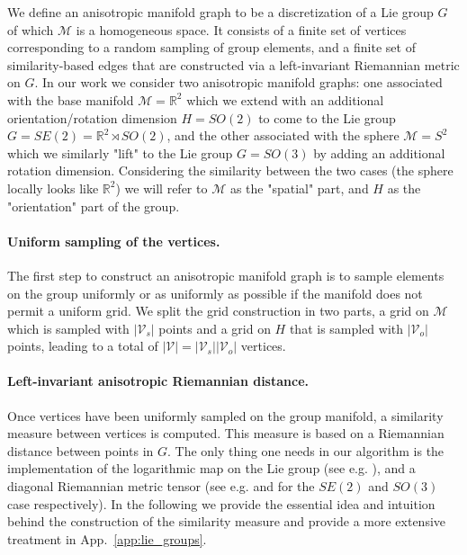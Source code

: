 \documentclass{article}
\begin{document}
We define an anisotropic manifold graph to be a discretization of a Lie group $G$ of which $\mathcal{M}$ is a homogeneous space. It consists of a finite set of vertices corresponding to a random sampling of group elements, and a finite set of similarity-based edges that are constructed via a left-invariant Riemannian metric on $G$. In our work we consider two anisotropic manifold graphs: one associated with the base manifold $\mathcal{M} = \mathbb{R}^2$ which we extend with an additional orientation/rotation dimension $H = SO(2)$ to come to the Lie group $G = SE(2) = \mathbb{R}^2 \rtimes SO(2)$, and the other associated with the sphere $\mathcal{M} = S^2$ which we similarly "lift" to the Lie group $G = SO(3)$ by adding an additional rotation dimension. %
Considering the similarity between the two cases (the sphere locally looks like $\mathbb{R}^2$) we will refer to $\mathcal{M}$ as the "spatial" part, and $H$ as the "orientation" part of the group. 

\paragraph{Uniform sampling of the vertices.} The first step to construct an anisotropic manifold graph is to sample elements on the group uniformly or as uniformly as possible if the manifold does not permit a uniform grid. We split the grid construction in two parts, a grid on $\mathcal{M}$ which is sampled with $|\mathcal{V}_s|$ points and a grid on $H$ that is sampled with $|\mathcal{V}_o|$ points, leading to a total of $|\mathcal{V}| = |\mathcal{V}_s| |\mathcal{V}_o|$ vertices.

\paragraph{Left-invariant anisotropic Riemannian distance.} Once vertices have been uniformly sampled on the group manifold, a similarity measure between vertices is computed. This measure is based on a Riemannian distance between points in $G$. The only thing one needs in our algorithm is the implementation of the logarithmic map on the Lie group (see e.g. \citep{bekkers2019b}), and a diagonal Riemannian metric tensor (see e.g. \citep{sanguinetti2015fastmarching} and \citep{mashtakov2017tracking} for the $SE(2)$ and $SO(3)$ case respectively). In the following we provide the essential idea and intuition behind the construction of the similarity measure and provide a more extensive treatment in App.~\ref{app:lie_groups}.
\end{document}
